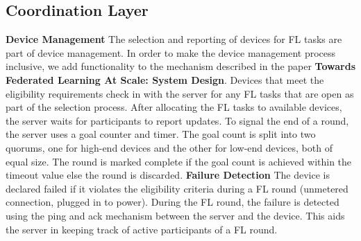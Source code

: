     \subsection{Coordination Layer}
        \textbf{Device Management} The selection and reporting of devices for FL tasks are part of device management. In order to make the device management process inclusive, we add functionality to the mechanism described in the paper \textbf{Towards Federated Learning At Scale: System Design}. Devices that meet the eligibility requirements check in with the server for any FL tasks that are open as part of the selection process. After allocating the FL tasks to available devices, the server waits for participants to report updates. To signal the end of a round, the server uses a goal counter and timer. The goal count is split into two quorums, one for high-end devices and the other for low-end devices, both of equal size. The round is marked complete if the goal count is achieved within the timeout value else the round is discarded. 
        \newline \newline
        \textbf{Failure Detection} The device is declared failed if it violates the eligibility criteria during a FL round (unmetered connection, plugged in to power). During the FL round, the failure is detected using the ping and ack mechanism between the server and the device. This aids the server in keeping track of active participants of a FL round.
            